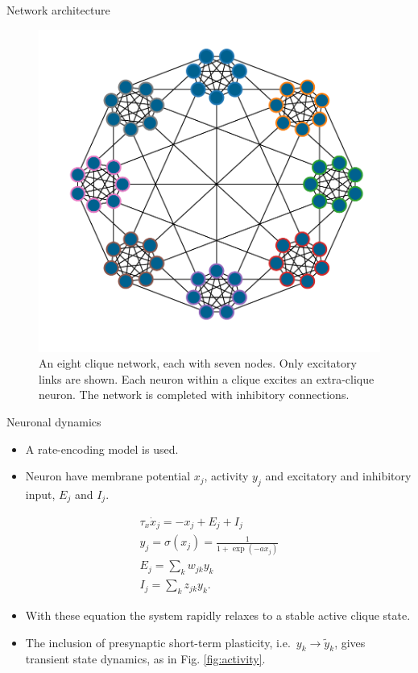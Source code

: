 \documentclass[final,hyperref={pdfpagelabels=false}]{beamer}
\begin{document}
\begin{frame}
\begin{columns}
\begin{column}{.30\textwidth}
\begin{minipage}[T]{.95\textwidth}
{\begin{block}{Network architecture}
			\begin{figure}
				\centering
				\includegraphics[width=.8\linewidth]{network2.pdf}
				\caption{An eight clique network, each with seven nodes. Only excitatory links are shown. Each neuron within a clique excites an extra-clique neuron. The network is completed with inhibitory connections.}
				\label{fig:network}
			\end{figure}
			\end{block}		
							
			\vfil
			\begin{block}{Neuronal dynamics}
				\begin{itemize}
					\item A rate-encoding model is used.
					\item Neuron have membrane potential $x_j$, activity $y_j$ and excitatory and inhibitory input, $E_j$ and $I_j$.
				\end{itemize}
			\begin{gather*}
				\tau_x \dot{x}_j = -x_j + E_j + I_j\\
				y_j = \sigma \left(x_j\right) = \frac{1}{1+\exp \left(-a x_j \right) } \\
				E_j = \sum_{k} w_{jk} y_k \\
				I_j = \sum_k z_{jk} y_k.
				\label{eq:neuron}
			\end{gather*}
			\begin{itemize}
				\item With these equation the system rapidly relaxes to a stable active clique state.
				
				\item The inclusion of presynaptic short-term plasticity, i.e.\ $y_k \rightarrow \tilde{y}_k$, gives transient state dynamics, as in Fig. \ref{fig:activity}.
			\end{itemize}		
		

\end{block}}
\end{minipage}
\end{column}
\end{columns}
\end{frame}
\end{document}
